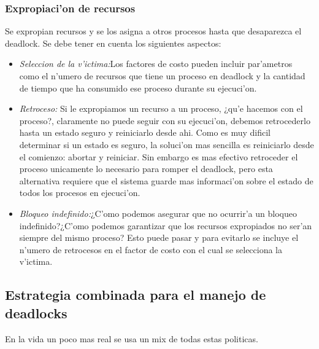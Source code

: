 \documentclass[a4paper,10pt]{article}
\begin{document}
\subsubsection{Expropiaci'on de recursos}
Se expropian recursos y se los asigna a otros procesos hasta que desaparezca el deadlock. Se debe tener en cuenta los siguientes aspectos:
\begin{itemize}
 \item \textit{Seleccion de la v'ictima:}Los factores de costo pueden incluir par'ametros como el n'umero de recursos que tiene un proceso en deadlock y la cantidad de tiempo que ha consumido ese proceso durante su ejecuci'on.
\item \textit{Retroceso:} Si le expropiamos un recurso a un proceso, ¿qu'e hacemos con el proceso?, claramente no puede seguir con su ejecuci'on, debemos retrocederlo hasta un estado seguro y reiniciarlo desde ahi.
Como es muy dificil determinar si un estado es seguro, la soluci'on mas sencilla es reiniciarlo desde el comienzo: abortar y reiniciar. Sin embargo es mas efectivo retroceder el proceso unicamente lo necesario para romper el deadlock, pero esta alternativa requiere que el sistema guarde mas informaci'on sobre el estado de todos los procesos en ejecuci'on.
\item \textit{Bloqueo indefinido:}¿C'omo podemos asegurar que no ocurrir'a un bloqueo indefinido?¿C'omo podemos garantizar que los recursos expropiados no ser'an siempre del mismo proceso? Esto puede pasar y para evitarlo se incluye el n'umero de retrocesos en el factor de costo con el cual se selecciona la v'ictima.
\end{itemize}

\subsection{Estrategia combinada para el manejo de deadlocks}
En la vida un poco mas real se usa un mix de todas estas politicas.
\end{document}
